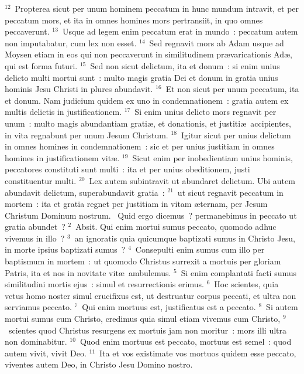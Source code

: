 ${}^{12}$~Propterea sicut per unum hominem peccatum in hunc mundum intravit, et per peccatum mors, et ita in omnes homines mors pertransiit, in quo omnes peccaverunt.
${}^{13}$~Usque ad legem enim peccatum erat in mundo~: peccatum autem non imputabatur, cum lex non esset.
${}^{14}$~Sed regnavit mors ab Adam usque ad Moysen etiam in eos qui non peccaverunt in similitudinem pr\ae varicationis Ad\ae , qui est forma futuri.
${}^{15}$~Sed non sicut delictum, ita et donum~: si enim unius delicto multi mortui sunt~: multo magis gratia Dei et donum in gratia unius hominis Jesu Christi in plures abundavit.
${}^{16}$~Et non sicut per unum peccatum, ita et donum. Nam judicium quidem ex uno in condemnationem~: gratia autem ex multis delictis in justificationem.
${}^{17}$~Si enim unius delicto mors regnavit per unum~: multo magis abundantiam grati\ae , et donationis, et justiti\ae\ accipientes, in vita regnabunt per unum Jesum Christum.
${}^{18}$~Igitur sicut per unius delictum in omnes homines in condemnationem~: sic et per unius justitiam in omnes homines in justificationem vit\ae .
${}^{19}$~Sicut enim per inobedientiam unius hominis, peccatores constituti sunt multi~: ita et per unius obeditionem, justi constituentur multi.
${}^{20}$~Lex autem subintravit ut abundaret delictum. Ubi autem abundavit delictum, superabundavit gratia~:
${}^{21}$~ut sicut regnavit peccatum in mortem~: ita et gratia regnet per justitiam in vitam \ae ternam, per Jesum Christum Dominum nostrum.
~Quid ergo dicemus~? permanebimus in peccato ut gratia abundet~?
${}^{2}$~Absit. Qui enim mortui sumus peccato, quomodo adhuc vivemus in illo~?
${}^{3}$~an ignoratis quia quicumque baptizati sumus in Christo Jesu, in morte ipsius baptizati sumus~?
${}^{4}$~Consepulti enim sumus cum illo per baptismum in mortem~: ut quomodo Christus surrexit a mortuis per gloriam Patris, ita et nos in novitate vit\ae\ ambulemus.
${}^{5}$~Si enim complantati facti sumus similitudini mortis ejus~: simul et resurrectionis erimus.
${}^{6}$~Hoc scientes, quia vetus homo noster simul crucifixus est, ut destruatur corpus peccati, et ultra non serviamus peccato.
${}^{7}$~Qui enim mortuus est, justificatus est a peccato.
${}^{8}$~Si autem mortui sumus cum Christo, credimus quia simul etiam vivemus cum Christo,
${}^{9}$~scientes quod Christus resurgens ex mortuis jam non moritur~: mors illi ultra non dominabitur.
${}^{10}$~Quod enim mortuus est peccato, mortuus est semel~: quod autem vivit, vivit Deo.
${}^{11}$~Ita et vos existimate vos mortuos quidem esse peccato, viventes autem Deo, in Christo Jesu Domino nostro.


